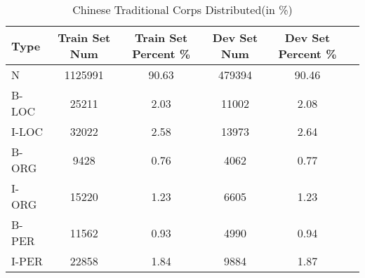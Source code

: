 \begin{table*}[htbp!]
    \centering
    \begin{tabular}{lccccc}
    \midrule
    Type  &  Train Set Num          & Train Set Percent \%         & Dev Set Num       & Dev Set Percent \%\\
    \midrule
    N     & 1125991       & 90.63               & 479394      & 90.46             \\
    B-LOC & 25211         & 2.03                & 11002       & 2.08              \\
    I-LOC & 32022         & 2.58                & 13973       & 2.64              \\
    B-ORG & 9428          & 0.76                & 4062        & 0.77              \\
    I-ORG & 15220         & 1.23                & 6605        & 1.23              \\
    B-PER & 11562         & 0.93                & 4990        & 0.94              \\
    I-PER & 22858         & 1.84                & 9884        & 1.87              \\

    \bottomrule
    \end{tabular}
\caption{Chinese Traditional Corps Distributed(in \%)}
\label{tab:text_cnn}
\end{table*}
